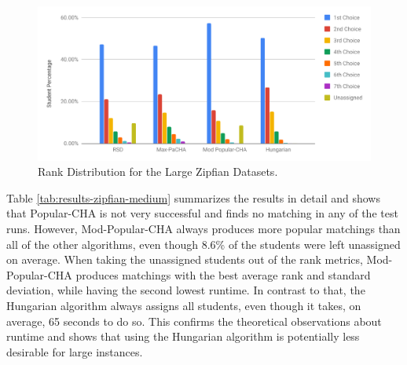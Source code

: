 \begin{figure}[h!]
  \centering
    \includegraphics[width=0.8\linewidth]{assets/plots/zipfian-medium.pdf}
    \caption{Rank Distribution for the Large Zipfian Datasets.}
    \label{fig:zipfian-medium-distribution}
\end{figure}

\begin{table}[h!]
  \centering
  \caption{Average Results for the Large Zipfian Dataset (2500 Students) with 10 Runs}
  \label{tab:results-zipfian-medium}
\end{table}

Table \ref{tab:results-zipfian-medium} summarizes the results in detail and shows that Popular-CHA is not very successful and finds no matching in any of the test runs. However, Mod-Popular-CHA always produces more popular matchings than all of the other algorithms, even though 8.6\% of the students were left unassigned on average. When taking the unassigned students out of the rank metrics, Mod-Popular-CHA produces matchings with the best average rank and standard deviation, while having the second lowest runtime. In contrast to that, the Hungarian algorithm always assigns all students, even though it takes, on average, 65 seconds to do so. This confirms the theoretical observations about runtime and shows that using the Hungarian algorithm is potentially less desirable for large instances.

